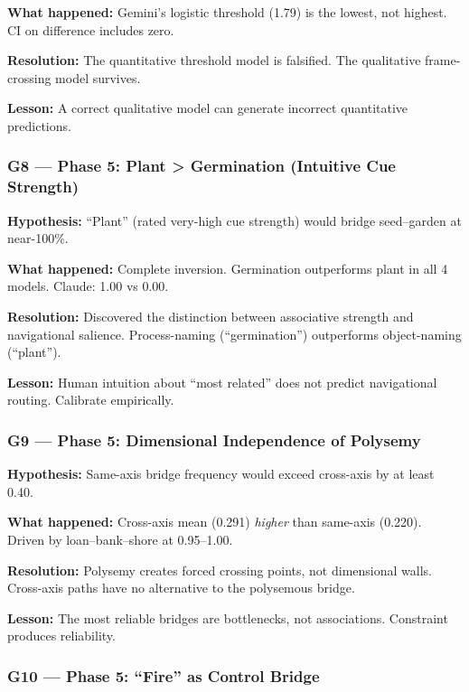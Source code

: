 \textbf{What happened:} Gemini's logistic threshold (1.79) is the lowest, not highest. CI on difference includes zero.

\textbf{Resolution:} The quantitative threshold model is falsified. The qualitative frame-crossing model survives.

\textbf{Lesson:} A correct qualitative model can generate incorrect quantitative predictions.

\subsubsection{G8 --- Phase 5: Plant \textgreater{} Germination (Intuitive Cue Strength)}\label{g8-phase-5-plant-germination-intuitive-cue-strength}

\textbf{Hypothesis:} ``Plant'' (rated very-high cue strength) would bridge seed--garden at near-100\%.

\textbf{What happened:} Complete inversion. Germination outperforms plant in all 4 models. Claude: 1.00 vs 0.00.

\textbf{Resolution:} Discovered the distinction between associative strength and navigational salience. Process-naming (``germination'') outperforms object-naming (``plant'').

\textbf{Lesson:} Human intuition about ``most related'' does not predict navigational routing. Calibrate empirically.

\subsubsection{G9 --- Phase 5: Dimensional Independence of Polysemy}\label{g9-phase-5-dimensional-independence-of-polysemy}

\textbf{Hypothesis:} Same-axis bridge frequency would exceed cross-axis by at least 0.40.

\textbf{What happened:} Cross-axis mean (0.291) \emph{higher} than same-axis (0.220). Driven by loan--bank--shore at 0.95--1.00.

\textbf{Resolution:} Polysemy creates forced crossing points, not dimensional walls. Cross-axis paths have no alternative to the polysemous bridge.

\textbf{Lesson:} The most reliable bridges are bottlenecks, not associations. Constraint produces reliability.

\subsubsection{G10 --- Phase 5: ``Fire'' as Control Bridge}\label{g10-phase-5-fire-as-control-bridge}

